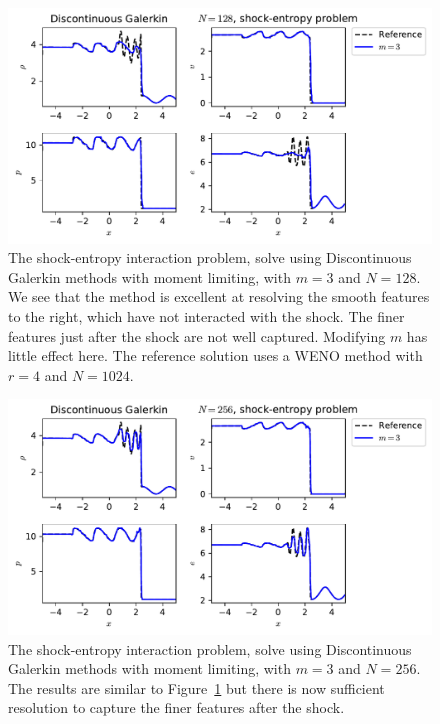 \begin{figure}[t]
\centering
\includegraphics[width=0.8\linewidth]{dg_shock_entropy_m3_N128}
\caption[Discontinuous Galerkin methods applied to the shock-entropy problem, low resolution]
{\label{fig:dg-euler-shockentropy-m3-N128} The shock-entropy interaction problem,
solve using Discontinuous Galerkin methods with moment limiting, with $m=3$ and
$N=128$. We see that the method is excellent at resolving the smooth features to
the right, which have not interacted with the shock. The finer features just
after the shock are not well captured. Modifying $m$ has little effect here. The
reference solution uses a WENO method with $r=4$ and $N=1024$.\\
}
\end{figure}
%

\begin{figure}[t]
\centering
\includegraphics[width=0.8\linewidth]{dg_shock_entropy_m3_N256}
\caption[Discontinuous Galerkin methods applied to the shock-entropy problem, high resolution]
{\label{fig:dg-euler-shockentropy-m3-N256} The shock-entropy interaction problem,
solve using Discontinuous Galerkin methods with moment limiting, with $m=3$ and
$N=256$. The results are similar to Figure~\ref{fig:dg-euler-shockentropy-m3-N128}
but there is now sufficient resolution to capture the finer features after the
shock.\\
}
\end{figure}
%

